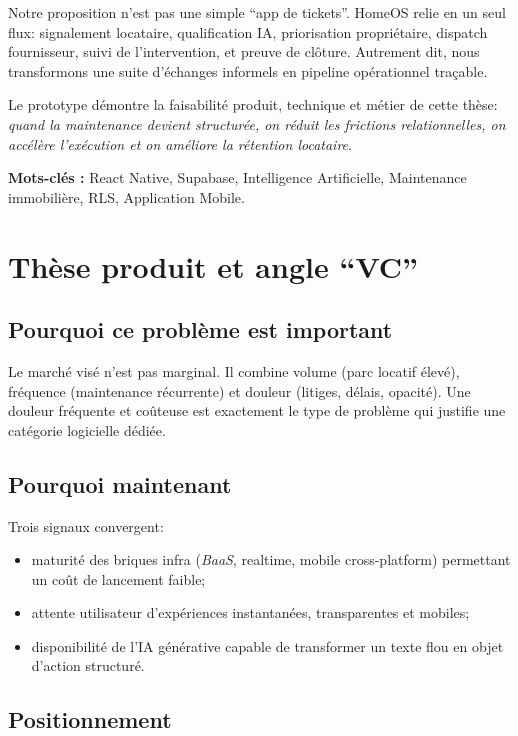 \documentclass[11pt,a4paper]{article}
\begin{document}
Notre proposition n'est pas une simple ``app de tickets''. HomeOS relie en un seul flux: signalement locataire, qualification IA, priorisation propriétaire, dispatch fournisseur, suivi de l'intervention, et preuve de clôture. Autrement dit, nous transformons une suite d'échanges informels en pipeline opérationnel traçable.

Le prototype démontre la faisabilité produit, technique et métier de cette thèse: \textit{quand la maintenance devient structurée, on réduit les frictions relationnelles, on accélère l'exécution et on améliore la rétention locataire}.

\vspace{0.5cm}
\textbf{Mots-clés :} React Native, Supabase, Intelligence Artificielle, Maintenance immobilière, RLS, Application Mobile.

\section{Thèse produit et angle ``VC''}

\subsection{Pourquoi ce problème est important}

Le marché visé n'est pas marginal. Il combine volume (parc locatif élevé), fréquence (maintenance récurrente) et douleur (litiges, délais, opacité). Une douleur fréquente et coûteuse est exactement le type de problème qui justifie une catégorie logicielle dédiée.

\subsection{Pourquoi maintenant}

Trois signaux convergent:

\begin{itemize}[leftmargin=1.4em]
  \item maturité des briques infra (\textit{BaaS}, realtime, mobile cross-platform) permettant un coût de lancement faible;
  \item attente utilisateur d'expériences instantanées, transparentes et mobiles;
  \item disponibilité de l'IA générative capable de transformer un texte flou en objet d'action structuré.
\end{itemize}

\subsection{Positionnement}
\end{document}
